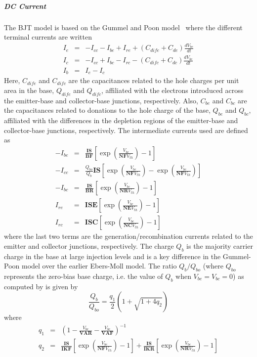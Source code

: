\subparagraph{DC Current}
The BJT model is based on the Gummel and Poon model~\cite{Grove:1967} where the
different terminal currents are written
\begin{eqnarray*}
I_{e} & = & -I_{cc} - I_{be} + I_{re} + (C_{dife} +C_{de})\frac{dV_{be}}{dt} \\
I_{c} & = & -I_{cc} + I_{bc} - I_{rc} - (C_{difc}+ C_{dc})\frac{dV_{bc}}{dt} \\
I_b & = & I_e -I_c
\end{eqnarray*}
Here, $C_{dife}$ and $C_{difc}$ are the capacitances related to the hole
charges per unit area in the base, $Q_{dife}$ and $Q_{difc}$,
affiliated with the electrons introduced across the emitter-base and
collector-base junctions, respectively.  Also, $C_{be}$ and $C_{bc}$ are the
capacitances related to donations to the hole charge of the base, $Q_{be}$ and
$Q_{bc}$,  affiliated with the differences in the depletion regions of the
emitter-base and collector-base junctions, respectively.  The
intermediate currents used are defined as
\begin{eqnarray*}
-I_{be} & = & \mathbf{\frac{IS}{BF}} \left[\exp \left(\frac{V_{be}}
{\mathbf{NF}V_{th}} \right) -1 \right] \\
-I_{cc} & = & \frac{Q_{bo}}{Q_{b}}\mathbf{IS} \left[\exp \left(\frac{V_{be}}
{\mathbf{NF} V_{th}} \right) -
\exp \left(\frac{V_{bc}}{\mathbf{NF}V_{th}} \right) \right] \\
-I_{bc} & = & \mathbf{\frac{IS}{BR}} \left[\exp \left(\frac{V_{bc}}
{\mathbf{NR}V_{th}} \right) - 1 \right] \\
I_{re} & = & \mathbf{ISE} \left[\exp \left(\frac{V_{be}}
{\mathbf{NE} V_{th}} \right) - 1 \right] \\
I_{rc} & = & \mathbf{ISC} \left[\exp \left(\frac{V_{bc}}
{\mathbf{NC}V_{th}} \right) - 1 \right]
\end{eqnarray*}
where the last two terms are the generation/recombination currents related to
the emitter and collector junctions, respectively.  The charge $Q_{b}$ is the
majority carrier charge in the base at large injection levels and is a key
difference in the Gummel-Poon model over the earlier Ebers-Moll model.  The
ratio $Q_b/Q_{bo}$ (where $Q_{bo}$ represents the zero-bias base charge, i.e.
the value of $Q_b$ when $V_{be}=V_{bc}=0$) as computed by \Xyce{} is given by
\[\frac{Q_b}{Q_{bo}} = \frac{q_1}{2}\left(1+\sqrt{1+4q_2}\right)\]
where
\begin{eqnarray*}
q_1 & = & \left(1-\frac{V_{be}}{\mathbf{VAR}}-\frac{V_{bc}}{\mathbf{VAF}}
\right)^{-1} \\
q_2 & = & \frac{\mathbf{IS}}{\mathbf{IKF}}\left[\exp\left(\frac{V_{be}}
{\mathbf{NF}V_{th}}\right)-1\right] + \frac{\mathbf{IS}}{\mathbf{IKR}}
\left[\exp\left(\frac{V_{bc}}{\mathbf{NR}V_{th}}\right)-1\right]
\end{eqnarray*}

